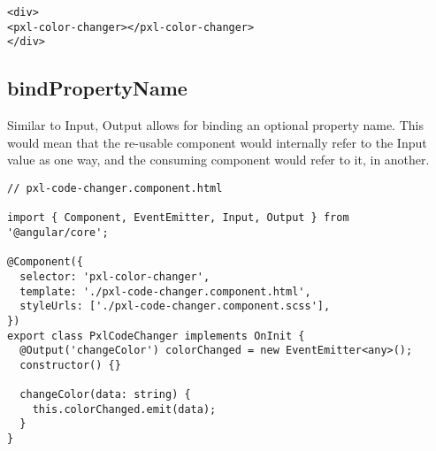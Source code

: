 \begin{lstlisting}
<div>
<pxl-color-changer></pxl-color-changer>
</div>
\end{lstlisting}

\subsection{ bindPropertyName }
Similar to Input, Output allows for binding an optional property name. This
would mean that the re-usable component would internally refer to the Input
value as one way, and the consuming component would refer to it, in another.

\begin{lstlisting}
// pxl-code-changer.component.html

import { Component, EventEmitter, Input, Output } from '@angular/core';

@Component({
  selector: 'pxl-color-changer',
  template: './pxl-code-changer.component.html',
  styleUrls: ['./pxl-code-changer.component.scss'],
})
export class PxlCodeChanger implements OnInit {
  @Output('changeColor') colorChanged = new EventEmitter<any>();
  constructor() {}

  changeColor(data: string) {
    this.colorChanged.emit(data);
  }
}
\end{lstlisting}
